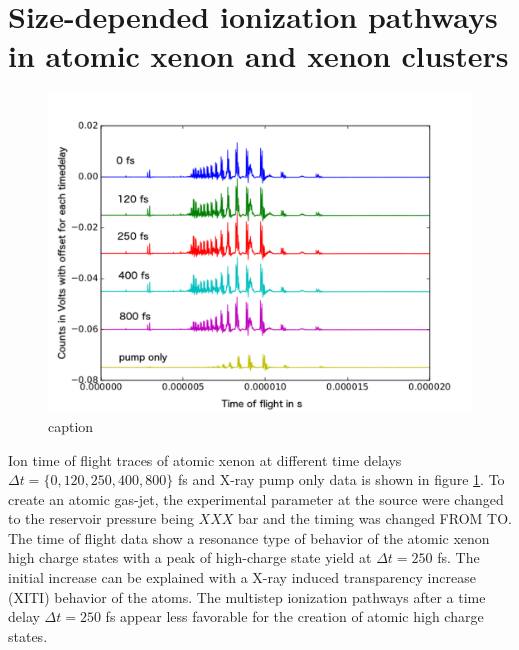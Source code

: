\section{Size-depended ionization pathways in atomic xenon and xenon clusters}
\begin{figure}
	\centering
		\includegraphics[width=1.00\textwidth]{images/results/TOF-atomic-xenon.png}
	\caption{caption}
	\label{fig:TOF-atomic-xenon}
\end{figure}
Ion time of flight traces of atomic xenon at different time delays $\Delta t = \{0, 120, 250, 400, 800\}$ fs and X-ray pump only data is shown in figure \ref{fig:TOF-atomic-xenon}. To create an atomic gas-jet, the experimental parameter at the source were changed to the reservoir pressure being $XXX$ bar and the timing was changed FROM TO. The time of flight data show a resonance type of behavior of the atomic xenon high charge states with a peak of high-charge state yield at $\Delta t = 250$ fs. The initial increase can be explained with a X-ray induced transparency increase (XITI) \citep{Schorb-2012-PRL} behavior of the atoms. The multistep ionization pathways after a time delay $\Delta t = 250$ fs appear less favorable for the creation of atomic high charge states.\\
